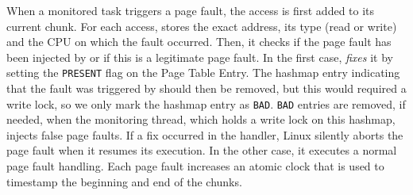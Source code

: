 When a monitored task triggers a page fault, the access is first added
to its current chunk. For each access, \Moca stores the exact address, its type (read
or write) and the CPU on which the fault occurred.  Then, it checks if the page
fault has been injected by \Moca or if this is a legitimate page fault.
In the first
case, \Moca \emph{fixes} it by setting the \texttt{PRESENT} flag on the
Page Table Entry.
The hashmap entry indicating that the fault was triggered by \Moca should then
be removed, but this would required a write lock, so we only mark the hashmap
entry as \texttt{BAD}. \texttt{BAD} entries are removed, if needed, when the
monitoring thread, which holds a write lock on this hashmap, injects false page faults.
If a fix occurred in the \Moca handler, Linux silently aborts the page fault
when it resumes its execution. In the other case, it executes a normal page fault handling. Each page
fault increases an atomic clock that is used to timestamp the beginning and end
of the chunks.

